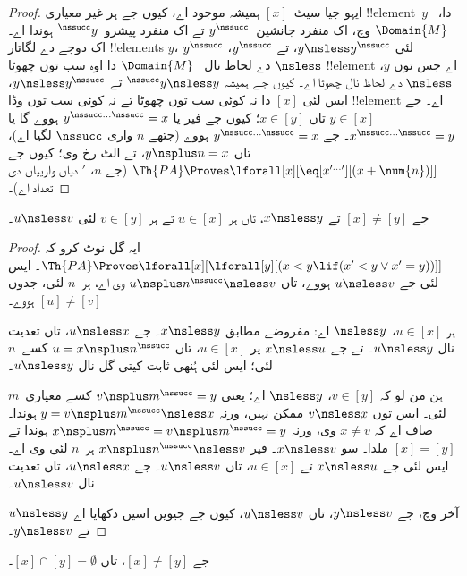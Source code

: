 \documentclass[../../../include/open-logic-section]{subfiles}
\begin{document}
\begin{proof}
ایہو جیا سیٹ~$[x]$ ہمیشہ موجود اے، کیوں جے
ہر غیر معیاری !!{element}~$y$ دا،~$\Domain{M}$ وچ، اک منفرد
جانشین~$y^\nssucc$ تے اک منفرد پیشرو~$^\nssucc y$
ہوندا اے۔ اک دوجے دے لگاتار !!{element}s $y$،
$y^\nssucc$ لئی $y \nsless y^\nssucc$، تے
$y^\nssucc$، $\nsless$ دے لحاظ نال
~$\Domain{M}$ دا اوہ سب توں چھوٹا !!{element} اے
جس توں $y$، $\nsless$ دے لحاظ نال چھوٹا اے۔
کیوں جے ہمیشہ $^\nssucc y \nsless y$ تے
$y \nsless y^\nssucc$، ایس لئی $[x]$ دا نہ کوئی
سب توں چھوٹا تے نہ کوئی سب توں وڈا !!{element} اے۔
جے $y \in [x]$ تاں $x \in [y]$؛ کیوں جے فیر
یا $y^{\nssucc\dots\nssucc} = x$ ہووے گا یا
$x^{\nssucc\dots\nssucc} = y$۔ جے
$y^{\nssucc\dots\nssucc} = x$ ہووے (جتھے
$n$ واری $\nssucc$ لگیا اے)، تاں
$y \nsplus n = x$، تے الٹ رخ وی؛ کیوں جے
$\Th{PA} \Proves \lforall[x][\eq[x^{\prime\dots\prime}][(x +
    \num{n})]]$ (جے $n$، $\prime$ دیاں وارییاں دی تعداد اے)۔
\end{proof}

\begin{prop}
جے $[x] \neq [y]$ تے $x \nsless y$، تاں ہر
$u \in [x]$ تے ہر $v \in [y]$ لئی $u \nsless v$۔
\end{prop}

\begin{proof}
ایہ گل نوٹ کرو کہ
$\Th{PA} \Proves \lforall[x][\lforall[y][(x < y \lif (x' < y
    \lor x' = y))]]$۔ ایس لئی جے $u \nsless v$
ہووے، تاں $u \nsplus n^\nssucc \nsless v$
وی اے، ہر~$n$ لئی، جدوں $[u] \neq [v]$ ہووے۔

ہر $u \in [x]$، $\nsless y$ اے: مفروضے مطابق
$x \nsless y$۔ جے $u \nsless x$، تاں تعدیت نال
$u \nsless y$۔ تے جے $x \nsless u$ پر
$u \in [x]$، تاں
$u = x\nsplus n^\nssucc$ کسے~$n$ لئی؛ ایس لئی ہُنھی ثابت کیتی
گل نال $u \nsless y$۔

ہن من لو کہ $v \in [y]$، $\nsless y$ اے؛ یعنی
$v \nsplus m^\nssucc = y$ کسے معیاری~$m$ لئی۔
ایس توں $v \nsless x$ ممکن نہیں، ورنہ
$y = v \nsplus m^\nssucc \nsless x$ ہوندا۔
صاف اے کہ $x \neq v$ وی، ورنہ
$x \nsplus m^\nssucc = v \nsplus m^\nssucc = y$
ہوندا تے $[x] = [y]$ ملدا۔ سو $x \nsless v$۔
فیر $x \nsplus n^\nssucc \nsless v$ ہر~$n$ لئی
وی اے۔ ایس لئی جے $x \nsless u$ تے
$u \in [x]$، تاں $u \nsless v$۔ جے
$u \nsless x$، تاں تعدیت نال $u \nsless v$۔

آخر وچ، جے $y \nsless v$، تاں $u \nsless v$،
کیوں جے جیویں اسیں دکھایا اے $u \nsless y$ تے
$y \nsless v$۔
\end{proof}

\begin{cor}
جے $[x] \neq [y]$، تاں $[x] \cap [y] = \emptyset$۔
\end{cor}
\end{document}
